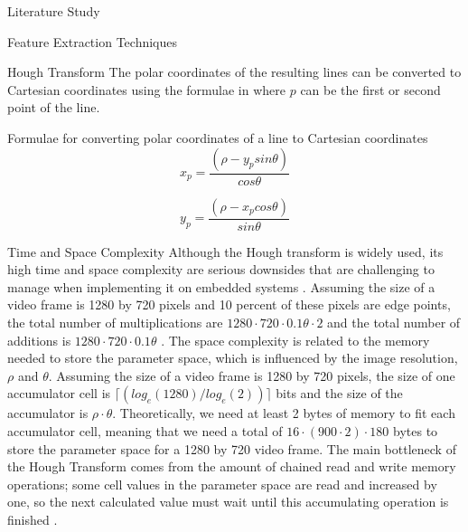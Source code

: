 \documentclass{matthijs}
\begin{document}
\begin{hoofdstuk}{Literature Study}
\begin{paragraaf}{Feature Extraction Techniques}
\begin{subparagraaf}{Hough Transform}
				The polar coordinates of the resulting lines can be converted to Cartesian coordinates using the formulae in  where $p$ can be the first or second point of the line.
				
				\begin{figuur}{Formulae for converting polar coordinates of a line to Cartesian coordinates}
					\begin{equation*}
						x_p = \frac{(\rho - y_p sin \theta)}{cos \theta}
					\end{equation*}

					\vspace{-2ex}

					\begin{equation*}
						y_p = \frac{(\rho - x_p cos \theta)}{sin \theta}
					\end{equation*}

					\vspace{1ex}

					\cite{dawkins2018polar}
				\end{figuur}
			
				\begin{subsubparagraaf}{Time and Space Complexity}
					Although the Hough transform is widely used, its high time and space complexity are serious downsides that are challenging to manage when implementing it on embedded systems \cite{dongkyun2008real}.
					Assuming the size of a video frame is 1280 by 720 pixels and 10 percent of these pixels are edge points, the total number of multiplications are $1280 \cdot 720 \cdot 0.1\theta \cdot 2 $ and the total number of additions is $1280 \cdot 720 \cdot 0.1\theta$ \cite{dongkyun2008real}.
					The space complexity is related to the memory needed to store the parameter space, which is influenced by the image resolution, $\rho$ and $\theta$.
					Assuming the size of a video frame is 1280 by 720 pixels, the size of one accumulator cell is $\lceil (log_e(1280)/log_e(2)) \rceil$ bits and the size of the accumulator is $\rho \cdot \theta$.
					Theoretically, we need at least 2 bytes of memory to fit each accumulator cell, meaning that we need a total of $16 \cdot(900 \cdot 2) \cdot 180$ bytes to store the parameter space for a 1280 by 720 video frame.
					The main bottleneck of the Hough Transform comes from the amount of chained read and write memory operations; some cell values in the parameter space are read and increased by one, so the next calculated value must wait until this accumulating operation is finished \cite{dongkyun2008real}.
					

\end{subsubparagraaf}
\end{subparagraaf}
\end{paragraaf}
\end{hoofdstuk}
\end{document}
